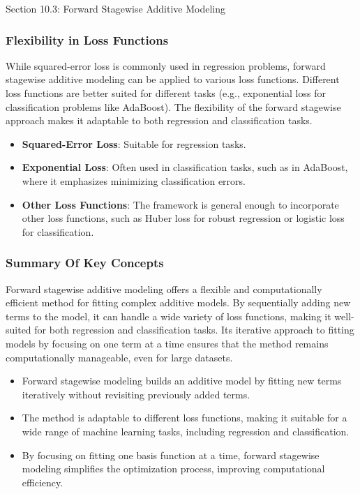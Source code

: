 \begin{notes}{Section 10.3: Forward Stagewise Additive Modeling}
    \subsubsection*{Flexibility in Loss Functions}
    
    While squared-error loss is commonly used in regression problems, forward stagewise additive modeling can be applied to various loss functions. Different loss functions are better suited for different 
    tasks (e.g., exponential loss for classification problems like AdaBoost). The flexibility of the forward stagewise approach makes it adaptable to both regression and classification tasks.
    
    \begin{highlight}
        \begin{itemize}
            \item \textbf{Squared-Error Loss}: Suitable for regression tasks.
            \item \textbf{Exponential Loss}: Often used in classification tasks, such as in AdaBoost, where it emphasizes minimizing classification errors.
            \item \textbf{Other Loss Functions}: The framework is general enough to incorporate other loss functions, such as Huber loss for robust regression or logistic loss for classification.
        \end{itemize}
    \end{highlight}
    
    \subsubsection*{Summary Of Key Concepts}
    
    Forward stagewise additive modeling offers a flexible and computationally efficient method for fitting complex additive models. By sequentially adding new terms to the model, it can handle a wide variety 
    of loss functions, making it well-suited for both regression and classification tasks. Its iterative approach to fitting models by focusing on one term at a time ensures that the method remains 
    computationally manageable, even for large datasets.
    
    \begin{highlight}
        \begin{itemize}
            \item Forward stagewise modeling builds an additive model by fitting new terms iteratively without revisiting previously added terms.
            \item The method is adaptable to different loss functions, making it suitable for a wide range of machine learning tasks, including regression and classification.
            \item By focusing on fitting one basis function at a time, forward stagewise modeling simplifies the optimization process, improving computational efficiency.
        \end{itemize}
    \end{highlight}
\end{notes}

